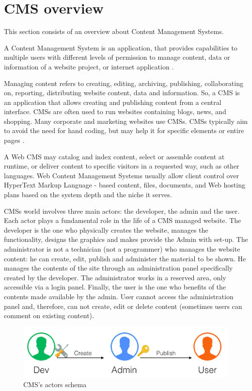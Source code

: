 \section{CMS overview}
\label{sec:CMS_overview}

This section consists of an overview about Content Management Systems.

A Content Management System is an application, that provides capabilities to multiple users with different levels of permission to manage content, data or information of a website project, or internet application \cite{cms_def}.

Managing content refers to creating, editing, archiving, publishing, collaborating on, reporting, distributing website content, data and information.
So, a CMS is an application that allows creating and publishing content from a central interface. CMSs are often used to run websites containing blogs, news, and shopping. Many corporate and marketing websites use CMSs. CMSs typically aim to avoid the need for hand coding, but may help it for specific elements or entire pages \cite{cms_over}. 

A Web CMS may catalog and index content, select or assemble content at runtime, or deliver content to specific visitors in a requested way, such as other languages. Web Content Management Systems usually allow client control over HyperText Markup Language - based content, files, documents, and Web hosting plans based on the system depth and the niche it serves.


CMSs world involves three main actors: the developer, the admin and the user. Each actor plays a fundamental role in the life of a CMS managed website. The developer is the one who physically creates the website, manages the functionality, designs the graphics and makes provide the Admin with set-up.
The administrator is not a technician (not a programmer) who manages the website content: he can create, edit, publish and administer the material to be shown.
He manages the contents of the site through an administration panel specifically created by the developer. The administrator works in a reserved area, only accessible via a login panel.
Finally, the user is the one who benefits of the contents made available by the admin. User cannot access the administration panel and, therefore, can not create, edit or delete content (sometimes users can comment on existing content).

\begin {figure}[h]
\graphicspath{{images/chapter_cms/}}
\includegraphics[width=\textwidth]{cms_schema}
\caption{CMS's actors schema}
\end {figure}


